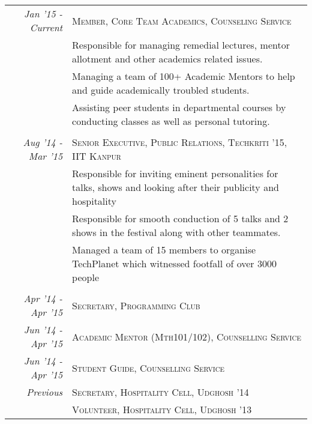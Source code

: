 \documentclass[10pt]{article}
\begin{document}
	\begin{tabular}{r|p{16cm}}	
	
	\normalsize\emph{Jan '15 - Current} & \textsc{Member, Core Team Academics, Counseling Service}\\
	\vspace{-0.25mm}		
	& \small{Responsible for managing remedial lectures, mentor allotment and other academics related issues.}\\
	\vspace{-0.25mm}
	& \small{Managing a team of 100+ Academic Mentors to help and guide academically troubled students.}\\
	& \small{Assisting peer students in departmental courses by conducting classes as well as personal tutoring.}\\

	\multicolumn{2}{c}{} \\
	\normalsize\emph{Aug '14 - Mar '15} & \textsc{Senior Executive, Public Relations, Techkriti '15, IIT Kanpur}\\
	\vspace{-0.25mm}		
	& \small{Responsible for inviting eminent personalities for talks, shows and looking after their publicity and hospitality}\\
	& \small{Responsible for smooth conduction of 5 talks and 2 shows in the festival along with other teammates.}\\
	& \small{Managed a team of 15 members to organise TechPlanet which witnessed footfall of over 3000 people}	\\

	\multicolumn{2}{c}{} \\
	\normalsize\emph{Apr '14 - Apr '15} & \textsc{Secretary, Programming Club}\\

	\normalsize\emph{Jun '14 - Apr '15} & \textsc{Academic Mentor (Mth101/102), Counselling Service}\\ 

	\normalsize\emph{Jun '14 - Apr '15} & \textsc{Student Guide, Counselling Service}\\

	\normalsize\emph{Previous} & \textsc{Secretary, Hospitality Cell, Udghosh '14}\\
	
	& \textsc{Volunteer, Hospitality Cell, Udghosh '13}\\

	\end{tabular}
	
\end{document}
